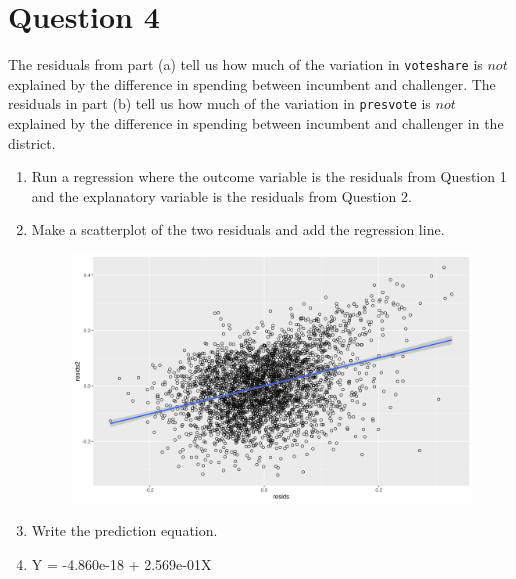 \documentclass[12pt,letterpaper]{article}
\begin{document}
\section*{Question 4}
\noindent The residuals from part (a) tell us how much of the variation in \texttt{voteshare} is $not$ explained by the difference in spending between incumbent and challenger. The residuals in part (b) tell us how much of the variation in \texttt{presvote} is $not$ explained by the difference in spending between incumbent and challenger in the district.
	\begin{enumerate}
		\item Run a regression where the outcome variable is the residuals from Question 1 and the explanatory variable is the residuals from Question 2.	
		
		\item Make a scatterplot of the two residuals and add the regression line. 	
		\vspace{1cm}
		\begin{figure}
			\includegraphics[width=0.75\linewidth]{sc_plot4.png}
			\label{Fig4}
		\end{figure}
		\item Write the prediction equation.
		\item[] Y = -4.860e-18 + 2.569e-01X
	\end{enumerate}
	
	\newpage	
\end{document}
